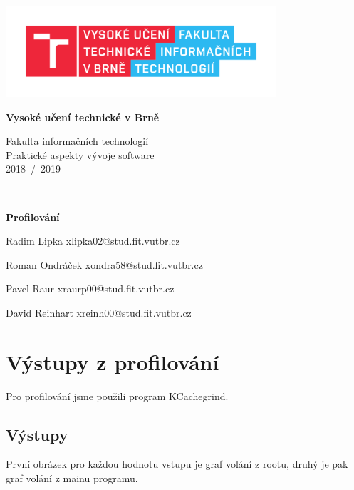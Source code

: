 \documentclass[12pt]{article}
\begin{document}
\begin{titlepage}
	\begin{center}

		\includegraphics[height = 96pt]{img/FIT_barevne_CMYK_CZ.pdf} \\

		\begin{LARGE}
			\textbf{Vysoké učení technické v Brně} \\
		\end{LARGE}

		\begin{large}
			Fakulta informačních technologií \\
			Praktické aspekty vývoje software \\
			2018~/~2019 
		\end{large}
		\\[78mm]

		\begin{huge}
				\textbf{Profilování} \\
			\begin{large}		
		Radim Lipka xlipka02@stud.fit.vutbr.cz
		
        Roman Ondráček xondra58@stud.fit.vutbr.cz
        
        Pavel Raur xraurp00@stud.fit.vutbr.cz
        
        David Reinhart xreinh00@stud.fit.vutbr.cz
        \end{large}
		\end{huge}
	\end{center}

	\vfill


\end{titlepage}

\newpage

\section{Výstupy z profilování}
Pro profilování jsme použili program KCachegrind.
\subsection{Výstupy}
První obrázek pro každou hodnotu vstupu je graf volání z rootu, druhý je pak graf volání z mainu programu.
\end{document}
